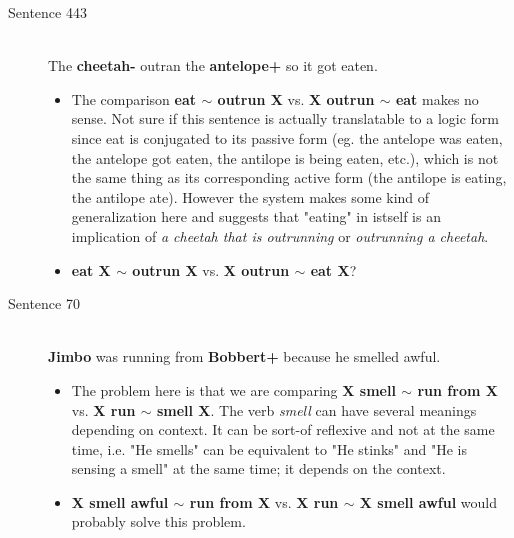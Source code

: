 \documentclass{scrartcl}
\begin{document}
\begin{description}
  \item[Sentence 443] \hfill \\
  The {\bf cheetah-} outran the {\bf antelope+} so it got eaten.
  \begin{itemize}
  	\item The comparison {\bf eat $\sim$ outrun X} vs. {\bf X outrun $\sim$ eat} makes no sense. Not sure if this sentence is actually translatable to a logic form since eat is conjugated to its passive form (eg. the antelope was eaten, the antelope got eaten, the antilope is being eaten, etc.), which is not the same thing as its corresponding active form (the antilope is eating, the antilope ate). However the system makes some kind of generalization here and suggests that "eating" in istself is an implication of {\it a cheetah that is outrunning} or {\it outrunning a cheetah}.
  	\item {\bf eat X $\sim$ outrun X} vs. {\bf X outrun $\sim$ eat X}?
  \end{itemize}

  \item[Sentence 70] \hfill \\
  {\bf Jimbo} was running from {\bf Bobbert+} because he smelled awful.
  \begin{itemize}
  	\item The problem here is that we are comparing {\bf X smell $\sim$ run from X} vs. {\bf X run $\sim$ smell X}. The verb {\it smell} can have several meanings depending on context. It can be sort-of reflexive and not at the same time, i.e. "He smells" can be equivalent to "He stinks" and "He is sensing a smell" at the same time; it depends on the context. 
  	\item {\bf X smell awful $\sim$ run from X} vs. {\bf X run $\sim$ X smell awful } would probably solve this problem.
  \end{itemize}


\end{description}
\end{document}
